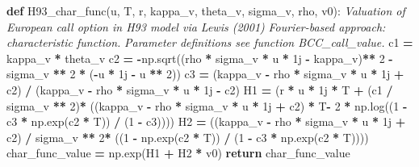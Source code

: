 \documentclass[
]{book}
\newenvironment{Shaded}{\begin{snugshade}}{\end{snugshade}}
\newcommand{\CommentTok}[1]{\textcolor[rgb]{0.56,0.35,0.01}{\textit{#1}}}
\newcommand{\ControlFlowTok}[1]{\textcolor[rgb]{0.13,0.29,0.53}{\textbf{#1}}}
\newcommand{\DecValTok}[1]{\textcolor[rgb]{0.00,0.00,0.81}{#1}}
\newcommand{\KeywordTok}[1]{\textcolor[rgb]{0.13,0.29,0.53}{\textbf{#1}}}
\newcommand{\NormalTok}[1]{#1}
\newcommand{\OperatorTok}[1]{\textcolor[rgb]{0.81,0.36,0.00}{\textbf{#1}}}
\newcommand{\OtherTok}[1]{\textcolor[rgb]{0.56,0.35,0.01}{#1}}
\begin{document}
\begin{Shaded}
\begin{Highlighting}[]
\KeywordTok{def}\NormalTok{ H93\_char\_func(u, T, r, kappa\_v, theta\_v, sigma\_v, rho, v0):}
  \CommentTok{\textquotesingle{}\textquotesingle{}\textquotesingle{} Valuation of European call option in H93 model via Lewis (2001)}
\CommentTok{  Fourier{-}based approach: characteristic function.}
\CommentTok{  Parameter definitions see function BCC\_call\_value.\textquotesingle{}\textquotesingle{}\textquotesingle{}}
\NormalTok{  c1 }\OperatorTok{=}\NormalTok{ kappa\_v }\OperatorTok{*}\NormalTok{ theta\_v}
\NormalTok{  c2 }\OperatorTok{=} \OperatorTok{{-}}\NormalTok{np.sqrt((rho }\OperatorTok{*}\NormalTok{ sigma\_v }\OperatorTok{*}\NormalTok{ u }\OperatorTok{*} \OtherTok{1j} \OperatorTok{{-}}\NormalTok{ kappa\_v)}\OperatorTok{**} \DecValTok{2} \OperatorTok{{-}}\NormalTok{ sigma\_v }\OperatorTok{**} \DecValTok{2} \OperatorTok{*}\NormalTok{ (}\OperatorTok{{-}}\NormalTok{u }\OperatorTok{*} \OtherTok{1j} \OperatorTok{{-}}\NormalTok{ u }\OperatorTok{**} \DecValTok{2}\NormalTok{))}
\NormalTok{  c3 }\OperatorTok{=}\NormalTok{ (kappa\_v }\OperatorTok{{-}}\NormalTok{ rho }\OperatorTok{*}\NormalTok{ sigma\_v }\OperatorTok{*}\NormalTok{ u }\OperatorTok{*} \OtherTok{1j} \OperatorTok{+}\NormalTok{ c2) }\OperatorTok{/}\NormalTok{ (kappa\_v }\OperatorTok{{-}}\NormalTok{ rho }\OperatorTok{*}\NormalTok{ sigma\_v }\OperatorTok{*}\NormalTok{ u }\OperatorTok{*} \OtherTok{1j} \OperatorTok{{-}}\NormalTok{ c2)}
\NormalTok{  H1 }\OperatorTok{=}\NormalTok{ (r }\OperatorTok{*}\NormalTok{ u }\OperatorTok{*} \OtherTok{1j} \OperatorTok{*}\NormalTok{ T }\OperatorTok{+}\NormalTok{ (c1 }\OperatorTok{/}\NormalTok{ sigma\_v }\OperatorTok{**} \DecValTok{2}\NormalTok{)}\OperatorTok{*}\NormalTok{ ((kappa\_v }\OperatorTok{{-}}\NormalTok{ rho }\OperatorTok{*}\NormalTok{ sigma\_v }\OperatorTok{*}\NormalTok{ u }\OperatorTok{*} \OtherTok{1j} \OperatorTok{+}\NormalTok{ c2) }\OperatorTok{*}\NormalTok{ T}\OperatorTok{{-}} \DecValTok{2} \OperatorTok{*}\NormalTok{ np.log((}\DecValTok{1} \OperatorTok{{-}}\NormalTok{ c3 }\OperatorTok{*}\NormalTok{ np.exp(c2 }\OperatorTok{*}\NormalTok{ T)) }\OperatorTok{/}\NormalTok{ (}\DecValTok{1} \OperatorTok{{-}}\NormalTok{ c3))))}
\NormalTok{  H2 }\OperatorTok{=}\NormalTok{ ((kappa\_v }\OperatorTok{{-}}\NormalTok{ rho }\OperatorTok{*}\NormalTok{ sigma\_v }\OperatorTok{*}\NormalTok{ u }\OperatorTok{*} \OtherTok{1j} \OperatorTok{+}\NormalTok{ c2) }\OperatorTok{/}\NormalTok{ sigma\_v }\OperatorTok{**} \DecValTok{2}\OperatorTok{*}\NormalTok{ ((}\DecValTok{1} \OperatorTok{{-}}\NormalTok{ np.exp(c2 }\OperatorTok{*}\NormalTok{ T)) }\OperatorTok{/}\NormalTok{ (}\DecValTok{1} \OperatorTok{{-}}\NormalTok{ c3 }\OperatorTok{*}\NormalTok{ np.exp(c2 }\OperatorTok{*}\NormalTok{ T))))}
\NormalTok{  char\_func\_value }\OperatorTok{=}\NormalTok{ np.exp(H1 }\OperatorTok{+}\NormalTok{ H2 }\OperatorTok{*}\NormalTok{ v0)}
  \ControlFlowTok{return}\NormalTok{ char\_func\_value}


\end{Highlighting}
\end{Shaded}
\end{document}
